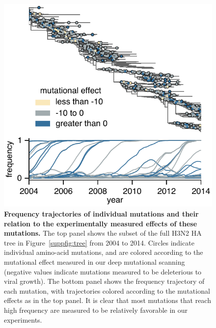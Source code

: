 \documentclass[9pt,twocolumn,twoside]{pnas-new-for-biorxiv}
\begin{document}
\begin{figure}[b!]
\centering
\includegraphics[width=0.95\linewidth]{figs/frequency_trajectory_ex/frequency_trajectory_ex.pdf}
\caption{\label{fig:frequency_trajectory}
{\bf Frequency trajectories of individual mutations and their relation to the experimentally measured effects of these mutations.}
The top panel shows the subset of the full H3N2 HA tree in Figure~\ref{suppfig:tree} from 2004 to 2014.
Circles indicate individual amino-acid mutations, and are colored according to the mutational effect measured in our deep mutational scanning (negative values indicate mutations measured to be deleterious to viral growth).
The bottom panel shows the frequency trajectory of each mutation, with trajectories colored according to the mutational effects as in the top panel.
It is clear that most mutations that reach high frequency are measured to be relatively favorable in our experiments.
}
\end{figure}
\end{document}
